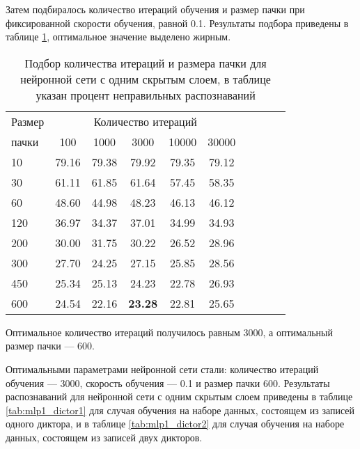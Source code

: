 Затем подбиралось количество итераций обучения и размер пачки при фиксированной скорости обучения, равной 0.1.
Результаты подбора приведены в таблице \ref{tab:mlp1_bf_iter_batch}, оптимальное значение выделено жирным.

\begin{table}[h]
	\centering
	\caption{Подбор количества итераций и размера пачки для нейронной сети с одним скрытым слоем, в таблице указан процент неправильных распознаваний}
	\label{tab:mlp1_bf_iter_batch}
	\begin{tabular}{| l | c | c | c | c | c | c | c | c | c |}
		\hline
		Размер	 & \multicolumn{5}{c|}{Количество итераций} \\
		\hhline{~---------}
		пачки \phantom{0000} & \phantom{000} 100 \phantom{000} & \phantom{000}1000\phantom{000} & \phantom{000}3000\phantom{000} & \phantom{00} 10000 \phantom{00} & \phantom{00} 30000 \phantom{00} \\
		\hline
		10		 & 79.16 & 79.38 & 79.92 & 79.35 & 79.12 \\
		30 		 & 61.11 & 61.85 & 61.64 & 57.45 & 58.35 \\
		60 		 & 48.60 & 44.98 & 48.23 & 46.13 & 46.12 \\
		120 	 & 36.97 & 34.37 & 37.01 & 34.99 & 34.93 \\
		200 	 & 30.00 & 31.75 & 30.22 & 26.52 & 28.96 \\
		300 	 & 27.70 & 24.25 & 27.15 & 25.85 & 28.56 \\
		450 	 & 25.34 & 25.13 & 24.23 & 22.78 & 26.93 \\
		600 	 & 24.54 & 22.16 & \textbf{23.28} & 22.81 & 25.65 \\
		\hline
	\end{tabular}
\end{table}

Оптимальное количество итераций получилось равным 3000, а оптимальный размер пачки --- 600.

Оптимальными параметрами нейронной сети стали: количество итераций обучения --- 3000, скорость обучения --- 0.1 и размер пачки 600.
Результаты распознаваний для нейронной сети с одним скрытым слоем приведены в таблице \ref{tab:mlp1_dictor1} для случая обучения на наборе данных, состоящем из записей одного диктора, и в таблице \ref{tab:mlp1_dictor2} для случая обучения на наборе данных, состоящем из записей двух дикторов.


